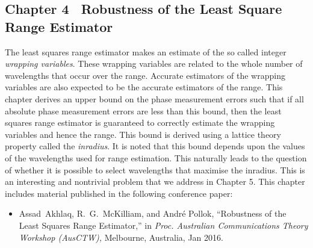 \subsection*{Chapter 4 \textemdash~Robustness of the Least Square Range Estimator}
The least squares range estimator makes an estimate of the so called integer \emph{wrapping variables}. These wrapping variables are related to the whole number of wavelengths that occur over the range. Accurate estimators of the wrapping variables are also expected to be the accurate estimators of the range. This chapter derives an upper bound on the phase measurement errors such that if all absolute phase measurement errors are less than this bound, then the least squares range estimator is guaranteed to correctly estimate the wrapping variables and hence the range. This bound is derived using a lattice theory property called the \emph{inradius}. It is noted that this bound depends upon the values of the wavelengths used for range estimation. This naturally leads to the question of whether it is possible to select wavelengths that maximise the inradius. This is an interesting and nontrivial problem that we address in Chapter 5.\newline
This chapter includes material published in the following conference paper:
\newline
\begin{itemize}
 \item{Assad~Akhlaq, R.~G.~McKilliam, and Andr\'e Pollok, ``{Robustness of the Least Squares Range Estimator},'' in \emph{Proc. Australian Communications Theory Workshop (AusCTW),}  Melbourne, Australia, Jan 2016.}
\end{itemize}


